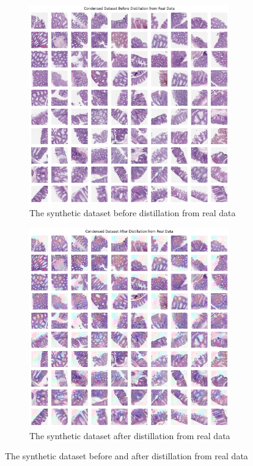 \documentclass[onecolumn]{IEEEtran}
\begin{document}
\begin{figure}[H]
    \centering
    \begin{subfigure}{.5\textwidth}
        \centering
        \includegraphics[width=0.95\textwidth]{images/MHIST_pad_before_distil_real.png}
        \caption{The synthetic dataset before distillation from real data}
        \label{fig:MHIST_pad_before_distil_real}
    \end{subfigure}%
    \begin{subfigure}{.5\textwidth}
        \centering
        \includegraphics[width=0.95\textwidth]{images/MHIST_pad_after_distil_real.png}
        \caption{The synthetic dataset after distillation from real data}
        \label{fig:MHIST_pad_after_distil_real}
    \end{subfigure}
    \caption{The synthetic dataset before and after distillation from real data}
\end{figure}
\end{document}
